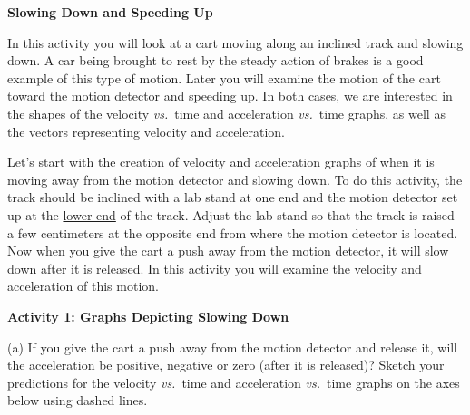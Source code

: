 \medskip
\textbf{Slowing Down and Speeding Up }

In this activity you will look at a cart moving along an inclined track and
slowing down. A car being brought to rest by the steady action of brakes is
a good example of this type of motion. Later you will examine the motion of
the cart toward the motion detector and speeding up. In both cases, we are interested
in the shapes of the velocity \textit{vs.}~time and acceleration \textit{vs.}~time graphs, as
well as the vectors representing velocity and acceleration. 

Let's start with the creation of velocity and acceleration graphs of when it
is moving away from the motion detector and slowing down. To do this activity,
the track should be inclined with a lab stand at one end and the motion detector set up at the \underline{lower end} of the track. Adjust the lab stand so that the track is raised a few centimeters at the opposite end from where the motion detector is located. Now when you give the cart a push away from the motion detector, it will slow down after it is released. In this activity you will examine the velocity and acceleration of this motion.

\pagebreak[2]
\textbf{Activity 1: Graphs Depicting Slowing Down} 

(a) If you give the cart a push away from the motion detector and release it,
will the acceleration be positive, negative or zero (after it is released)?
Sketch your predictions for the velocity \textit{vs.}~time and acceleration \textit{vs.}~time
graphs on the axes below using dashed lines.

